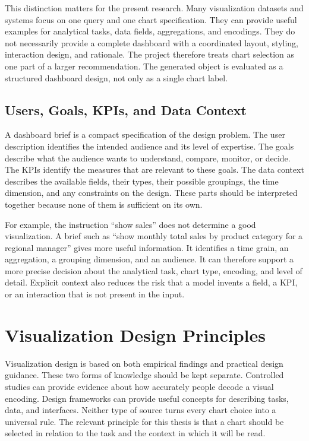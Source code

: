 This distinction matters for the present research. Many visualization datasets and systems focus on one query and one chart specification. They can provide useful examples for analytical tasks, data fields, aggregations, and encodings. They do not necessarily provide a complete dashboard with a coordinated layout, styling, interaction design, and rationale. The project therefore treats chart selection as one part of a larger recommendation. The generated object is evaluated as a structured dashboard design, not only as a single chart label.

\subsection{Users, Goals, KPIs, and Data Context}

A dashboard brief is a compact specification of the design problem. The user description identifies the intended audience and its level of expertise. The goals describe what the audience wants to understand, compare, monitor, or decide. The KPIs identify the measures that are relevant to these goals. The data context describes the available fields, their types, their possible groupings, the time dimension, and any constraints on the design. These parts should be interpreted together because none of them is sufficient on its own.

For example, the instruction ``show sales'' does not determine a good visualization. A brief such as ``show monthly total sales by product category for a regional manager'' gives more useful information. It identifies a time grain, an aggregation, a grouping dimension, and an audience. It can therefore support a more precise decision about the analytical task, chart type, encoding, and level of detail. Explicit context also reduces the risk that a model invents a field, a KPI, or an interaction that is not present in the input.

\section{Visualization Design Principles}

Visualization design is based on both empirical findings and practical design guidance. These two forms of knowledge should be kept separate. Controlled studies can provide evidence about how accurately people decode a visual encoding. Design frameworks can provide useful concepts for describing tasks, data, and interfaces. Neither type of source turns every chart choice into a universal rule. The relevant principle for this thesis is that a chart should be selected in relation to the task and the context in which it will be read.

